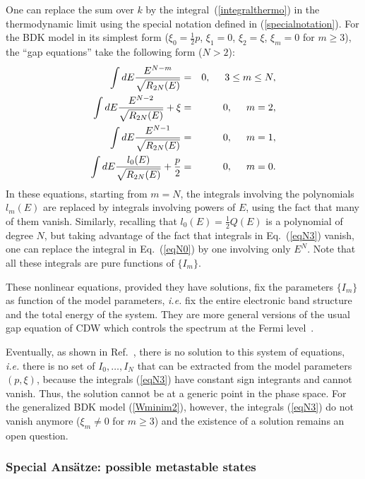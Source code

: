 \documentclass[]{revtex4-1}
\begin{document}
One can replace the sum over $k$ by the integral~(\ref{integralthermo}) in the thermodynamic limit using the special notation defined in (\ref{specialnotation}).
For the BDK model in its simplest form ($\xi_0=\frac{1}{2} p$, $\xi_1=0$, $\xi_2=\xi$, $\xi_m=0$ for $m \geq 3$), the ``gap equations'' take the following form ($N>2$):
\begin{eqnarray}
 \int dE \frac{E^{N-m}  }{\sqrt{R_{2N}(E)}} &=& 0, \hspace{.5cm} 3 \leq m \leq N, \label{eqN3} \\
 \int dE \frac{E^{N-2}  }{\sqrt{R_{2N}(E)}}+\xi &=& 0,  \hspace{.5cm} m=2, \label{eqN2} \\
   \int dE \frac{E^{N-1}  }{\sqrt{R_{2N}(E)}} &=& 0,  \hspace{.5cm} m=1, \label{eqN1} \\
  \int dE \frac{ l_0(E)  }{\sqrt{R_{2N}(E)}}+ \frac{p}{2} &=& 0,  \hspace{.5cm} m=0. \label{eqN0} \end{eqnarray}
In these equations, starting from $m=N$, the integrals involving the polynomials $l_m(E)$ are replaced by integrals involving powers of $E$, using the fact that many of them vanish. Similarly, recalling that $l_0(E)=\frac{1}{2} Q(E)$ is a polynomial of degree $N$, but taking advantage of the fact that integrals in Eq.~(\ref{eqN3}) vanish, one can replace the integral in Eq.~(\ref{eqN0}) by one involving only $E^N$. Note that all these integrals are pure functions of $\{I_m \}$.

These nonlinear equations, provided they have solutions, fix the parameters $\{I_m \}$ as function of the model parameters, \textit{i.e.} fix the entire electronic band structure and the total energy of the system. They are more general versions of the usual gap equation of CDW which controls the spectrum  at the Fermi level~\cite{toombs}.

Eventually, as shown in Ref.~\cite{BDK}, there is no solution to this system of equations, \textit{i.e.} there is no set of $I_0,\dots,I_N$ that can be extracted from the model parameters $(p,\xi)$, because the integrals (\ref{eqN3}) have constant sign integrants and cannot vanish. Thus, the solution cannot be at a generic point in the phase space.
For the generalized BDK model (\ref{Wminim2}), however, the  integrals (\ref{eqN3}) do not vanish anymore  ($\xi_m \neq 0$ for $m\geq 3$) and the existence of a solution remains an open question.

\subsubsection{Special Ans\"atze: possible metastable states}
\label{specialcase0}
\end{document}
